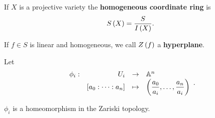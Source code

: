 \begin{definition}
If $ X $ is a projective variety the \textbf{homogeneous coordinate ring} is
$$ S\left( X \right) = \dfrac{S}{I\left( X \right)}. $$
\end{definition}

\begin{definition}
If $ f \in S $ is linear and homogeneous, we call $ Z\left( f \right) $ a \textbf{hyperplane}.
\end{definition}

Let
$$ \function[\phi_i]{U_i}{\A^n}{\sb{a_0 : \dots : a_n}}{\rb{\dfrac{a_0}{a_i}, \dots, \dfrac{a_n}{a_i}}}. $$

\begin{proposition}
$ \phi_i $ is a homeomorphism in the Zariski topology.
\end{proposition}

